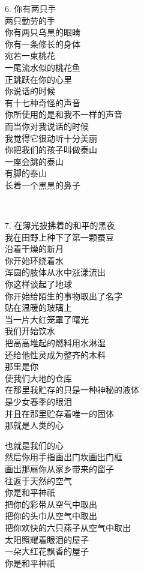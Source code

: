 \documentclass{article}
\begin{document}
6. 你有两只手\\
两只勤劳的手\\
你有两只乌黑的眼睛\\
你有一条修长的身体\\
宛若一束桃花\\
一尾流水似的桃花鱼\\
正跳跃在你的心里\\
你说话的时候\\
有十七种奇怪的声音\\
你所使用的是和我不一样的声音\\
而当你对我说话的时候\\
我觉得它很动听十分美丽\\
你把我们的孩子叫做泰山\\
一座会跳的泰山\\
有脚的泰山
\\
长着一个黑黑的鼻子 

\\
\newpage

7. 在薄光披拂着的和平的黑夜 \\ 


我在田野上种下了第一颗蚕豆\\
沿着干燥的新月\\
你开始环绕着水\\
浑圆的肢体从水中涨漾流出\\
你这样谈起了地球\\
你开始给陌生的事物取出了名字
\\
贴在温暖的玻璃上 \\ 


当一片大红笼罩了曙光\\
我们开始饮水\\
把高高堆起的燃料用水淋湿\\
还给他性灵成为整齐的木料\\
那里是你
\\
使我们大地的仓库 \\ 


在那里我贮存的只是一种神秘的液体\\
是少女春季的眼泪\\
并且在那里贮存着唯一的固体\\
那就是人类的心
\\
\newpage

也就是我们的心 \\ 


然后你用手指画出门坎画出门框\\
画出那扇你从家乡带来的窗子\\
往返于天然的空气\\
你是和平神祇\\
把你的彩带从空气中取出\\
把你的头巾从空气中取出\\
把你欢快的六只燕子从空气中取出\\
太阳照耀着眼泪的屋子\\
一朵大红花飘香的屋子
\\
你是和平神祇 \\ 
\end{document}
